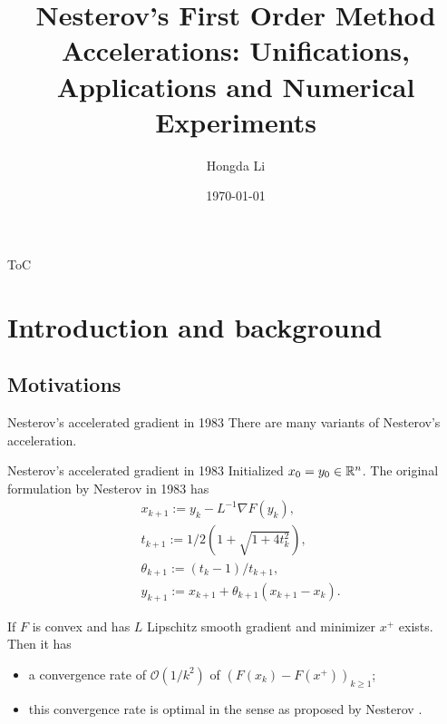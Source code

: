 \documentclass[11pt]{beamer}
\author{Hongda Li}
\title[Thesis Proposal Talk]{
    Nesterov's First Order Method Accelerations: Unifications, Applications and Numerical Experiments
}
\institute[UBCO]{
    University of British Columbia Okanagan
}
\date{\today}
\theoremstyle{definition}
\begin{document}
\begin{frame}
    \titlepage
\end{frame}

\begin{frame}{ToC}
    \tableofcontents
\end{frame}

\section{Introduction and background}
    \subsection{Motivations}
        \begin{frame}{Nesterov's accelerated gradient in 1983}
            There are many variants of Nesterov's acceleration. 
            \begin{block}{Nesterov's accelerated gradient in 1983}
                Initialized $x_0 = y_0 \in \mathbb R^n$. 
                The original formulation by Nesterov in 1983 \cite{nesterov_method_1983} has
                \begin{align*}
                    & x_{k + 1} := y_k - L^{-1}\nabla F(y_k),
                    \\
                    & t_{k + 1} := 1/2\left(1 + \sqrt{1 + 4t_{k}^2}\right),
                    \\
                    & \theta_{k + 1} := (t_{k} - 1)/t_{k + 1}, \label{eqn:example-algorithm}
                    \\
                    & y_{k + 1} := x_{k + 1} + \theta_{k + 1}(x_{k + 1} - x_k).
                \end{align*}    
            \end{block}
            If $F$ is convex and has $L$ Lipschitz smooth gradient and minimizer $x^+$ exists. 
            Then it has
            \begin{itemize}
                \item a convergence rate of $\mathcal O(1/k^2)$ of $(F(x_k) - F(x^+))_{k \ge 1}$;
                \item this convergence rate is optimal in the sense as proposed by Nesterov \cite{nesterov_lectures_2018}.
            \end{itemize}
        \end{frame}
\end{document}
